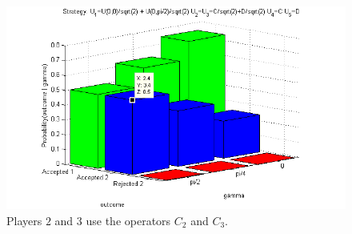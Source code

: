 \begin{table}[h]
\begin{figure}[h]
\centering 
\includegraphics[scale=0.80]{Figures/1.5qubit/mixedmixedclassical.png}
\caption{Players $2$ and $3$ use the operators $C_{2}$ and $C_{3}$. }
\label{fig:pg_3players_99_0_1:2}
\end{figure}

\end{table}
